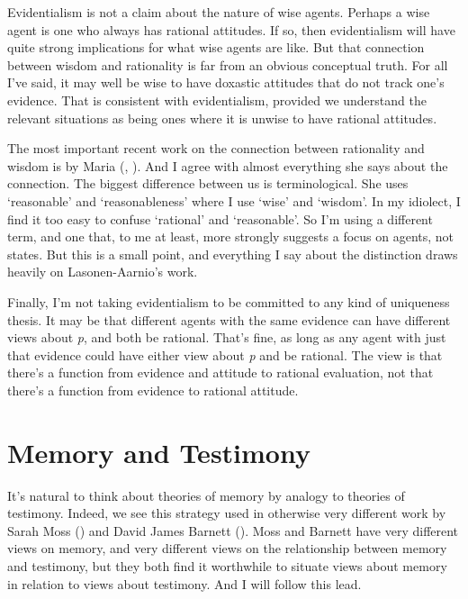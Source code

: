 \documentclass[
  10pt,
  letterpaper,
  DIV=11,
  numbers=noendperiod,
  twoside]{scrartcl}
\begin{document}
Evidentialism is not a claim about the nature of wise agents. Perhaps a
wise agent is one who always has rational attitudes. If so, then
evidentialism will have quite strong implications for what wise agents
are like. But that connection between wisdom and rationality is far from
an obvious conceptual truth. For all I've said, it may well be wise to
have doxastic attitudes that do not track one's evidence. That is
consistent with evidentialism, provided we understand the relevant
situations as being ones where it is unwise to have rational attitudes.

The most important recent work on the connection between rationality and
wisdom is by Maria (, ). And I agree with
almost everything she says about the connection. The biggest difference
between us is terminological. She uses `reasonable' and `reasonableness'
where I use `wise' and `wisdom'. In my idiolect, I find it too easy to
confuse `rational' and `reasonable'. So I'm using a different term, and
one that, to me at least, more strongly suggests a focus on agents, not
states. But this is a small point, and everything I say about the
distinction draws heavily on Lasonen-Aarnio's work.

Finally, I'm not taking evidentialism to be committed to any kind of
uniqueness thesis. It may be that different agents with the same
evidence can have different views about \emph{p}, and both be rational.
That's fine, as long as any agent with just that evidence could have
either view about \emph{p} and be rational. The view is that there's a
function from evidence and attitude to rational evaluation, not that
there's a function from evidence to rational attitude.

\section{Memory and Testimony}\label{memoryandtestimony}

It's natural to think about theories of memory by analogy to theories of
testimony. Indeed, we see this strategy used in otherwise very different
work by Sarah Moss () and David James
Barnett (). Moss and Barnett have very
different views on memory, and very different views on the relationship
between memory and testimony, but they both find it worthwhile to
situate views about memory in relation to views about testimony. And I
will follow this lead.
\end{document}
